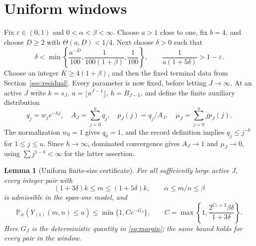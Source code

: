 \documentclass[11pt]{amsart}
\newtheorem{lemma}[theorem]{Lemma}
\theoremstyle{remark}\newtheorem{remark}[theorem]{Remark}
\newcommand{\Pp}{\mathbb P}
\begin{document}
\section{Uniform windows}\label{sec:windows}
Fix $\varepsilon\in(0,1)$ and $0<\alpha<\beta<\infty$. Choose $a>1$ close
to one, fix $b=4$, and choose $D\ge2$ with $\Theta(a,D)<1/4$. Next choose
$\delta>0$ such that
\begin{equation}\label{eq:parameters}
 \delta<\min\left\{\frac{a^{-D}}{100},\frac1{100(1+\beta)},\frac1{100}\right\},
 \qquad \frac1{a(1+5\delta)}>1-\varepsilon.
\end{equation}
Choose an integer $K\ge4(1+\beta)$, and then the fixed terminal data from
Section~\ref{sec:residual}. Every parameter is now fixed, before letting $J\to\infty$.
At an active $J$ write $k=s_J$, $u=\lfloor a^{J-1}\rfloor$, $h=B_{J-1}$,
and define the finite auxiliary distribution
\begin{equation}\label{eq:auxiliary}
 q_j=w_je^{-hj},\quad A_J=\sum_{j=0}^{u}q_j,\quad
 p_J(j)=q_j/A_J,\quad \mu_J=\sum_{j=0}^{u}j p_J(j).
\end{equation}
The normalization $w_0=1$ gives $q_0=1$, and the record definition implies
$q_j\le j^{-b}$ for $1\le j\le u$.
Since $h\to\infty$, dominated convergence gives $A_J\to1$ and $\mu_J\to0$,
using $\sum j^{1-b}<\infty$ for the latter assertion.

\begin{lemma}[Uniform finite-size certificate]\label{lem:certificate}
For all sufficiently large active $J$, every integer pair with
\begin{equation}\label{eq:slab}
 (1+3\delta)k\le m\le(1+5\delta)k,\qquad
 \alpha\le m/n\le\beta
\end{equation}
is admissible in the span-one model, and
\begin{equation}\label{eq:certificate}
 \Pp_w(Y_{(1)}(m,n)\le u)\le\min\{1,C e^{-G_J}\},\qquad
 C=\max\left\{1,\frac{2^{C_*+3}\beta\delta}{1+3\delta}\right\}.
\end{equation}
Here $G_J$ is the deterministic quantity in \eqref{eq:margin}; the same
bound holds for every pair in the window.
\end{lemma}
\end{document}
